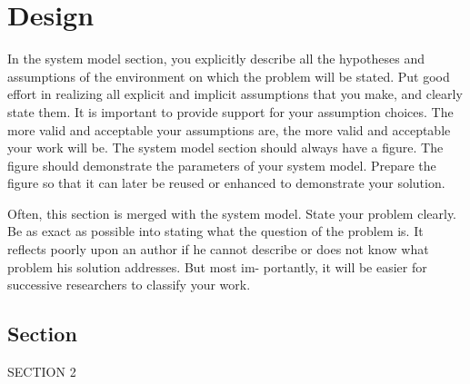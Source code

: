 

\chapter{Design}
\label{chap:design}

In the system model section, you explicitly describe all the
hypotheses and assumptions of the environment on which
the problem will be stated. Put good effort in realizing
all explicit and implicit assumptions that you make, and
clearly state them. It is important to provide support for
your assumption choices. The more valid and acceptable
your assumptions are, the more valid and acceptable your
work will be.
The system model section should always have a figure.
The figure should demonstrate the parameters of your
system model. Prepare the figure so that it can later be
reused or enhanced to demonstrate your solution.

Often, this section is merged with the system model.
State your problem clearly. Be as exact as possible into
stating what the question of the problem is. It reflects
poorly upon an author if he cannot describe or does not
know what problem his solution addresses. But most im-
portantly, it will be easier for successive researchers to
classify your work.

\section{Section}

SECTION 2
